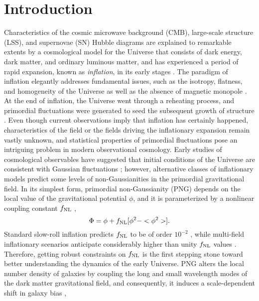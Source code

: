 \section{Introduction}
\label{sec:introduction}
Characteristics of the cosmic microwave background (CMB), large-scale structure (LSS), and supernovae (SN) Hubble diagrams are explained to remarkable extents by a cosmological model for the Universe that consists of dark energy, dark matter, and ordinary luminous matter, and has experienced a period of rapid expansion, known as \textit{inflation}, in its early stages \citep[see, e.g.,][]{weinberg2013observational}. The paradigm of inflation elegantly addresses fundamental issues, such as the isotropy, flatness, and homogeneity of the Universe as well as the absence of magnetic monopole \citep[see, e.g.,][]{weinberg2008cosmology}. At the end of inflation, the Universe went through a reheating process, and primordial fluctuations were generated to seed the subsequent growth of structure \citep{kofman1994reheating, bassett2006inflation, lyth2009primordial}. Even though current observations imply that inflation has certainly happened, characteristics of the field or the fields driving the inflationary expansion remain vastly unknown, and statistical properties of primordial fluctuations pose an intriguing problem in modern observational cosmology. Early studies of cosmological observables have suggested that initial conditions of the Universe are consistent with Gaussian fluctuations \citep{guth2005inflationary}; however, alternative classes of inflationary models predict some levels of non-Gaussianities in the primordial gravitational field. In its simplest form, primordial non-Gaussianity (PNG) depends on the local value of the gravitational potential $\phi$, and it is parameterized by a nonlinear coupling constant $f_{\rm NL}$ \citep{komatsu2001acoustic},
\begin{equation}
 \Phi = \phi + f_{\rm NL} [\phi^{2} - <\phi^{2}>].
\end{equation}
Standard slow-roll inflation predicts $f_{\rm NL}$ to be of order $10^{-2}$ \citep[see, e.g.,][for a review]{alvarez2014arXiv1412.4671A}, while multi-field inflationary scenarios anticipate considerably higher than unity $f_{\rm NL}$ values \citep[see, e.g.,][]{de2017next}. Therefore, getting robust constraints on $f_{\rm NL}$ is the first stepping stone toward better understanding the dynamics of the early Universe. PNG alters the local number density of galaxies by coupling the long and small wavelength modes of the dark matter gravitational field, and consequently, it induces a scale-dependent shift in galaxy bias \citep[see, e.g.,][]{dalal2008imprints, slosar2008constraints},
